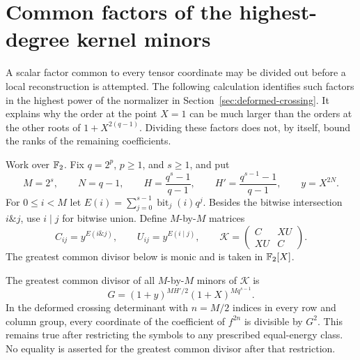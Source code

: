 \section{Common factors of the highest-degree kernel minors}
\label{sec:digit-kernel-divisors}

A scalar factor common to every tensor coordinate may be divided out
before a local reconstruction is attempted. The following calculation
identifies such factors in the highest power of the normalizer in
Section~\ref{sec:deformed-crossing}. It explains why the order at the
point $X=1$ can be much larger than the orders at the other roots of
$1+X^{2(q-1)}$. Dividing these factors does not, by itself, bound the
ranks of the remaining coefficients.

Work over $\mathbb F_2$. Fix $q=2^p$, $p\geq1$, and $s\geq1$, and put
\[
 M=2^s,\qquad N=q-1,\qquad
 H=\frac{q^s-1}{q-1},\qquad H'=\frac{q^{s-1}-1}{q-1},
 \qquad y=X^{2N}.
\]
For $0\leq i<M$ let $E(i)=\sum_{j=0}^{s-1}\operatorname{bit}_j(i)q^j$.
Besides the bitwise intersection $i\mathbin{\&}j$, use
$i\mathbin{|}j$ for bitwise union. Define $M$-by-$M$ matrices
\[
 C_{ij}=y^{E(i\mathbin{\&}j)},\qquad
 U_{ij}=y^{E(i\mathbin{|}j)},\qquad
 \mathcal K=\begin{pmatrix}C&XU\\XU&C\end{pmatrix}.
\]
The greatest common divisor below is monic and is taken in $\mathbb F_2[X]$.

\begin{proposition}
\label{prop:digit-kernel-minor-divisor}
The greatest common divisor of all $M$-by-$M$ minors of $\mathcal K$ is
\begin{equation}\label{eq:digit-kernel-gcd}
 G=(1+y)^{MH'/2}(1+X)^{M q^{s-1}}.
\end{equation}
In the deformed crossing determinant with $n=M/2$ indices in every
row and column group, every coordinate of the coefficient of $f^{2n}$
is divisible by $G^2$. This remains true after restricting the symbols
to any prescribed equal-energy class. No equality is asserted for the
greatest common divisor after that restriction.
\end{proposition}

